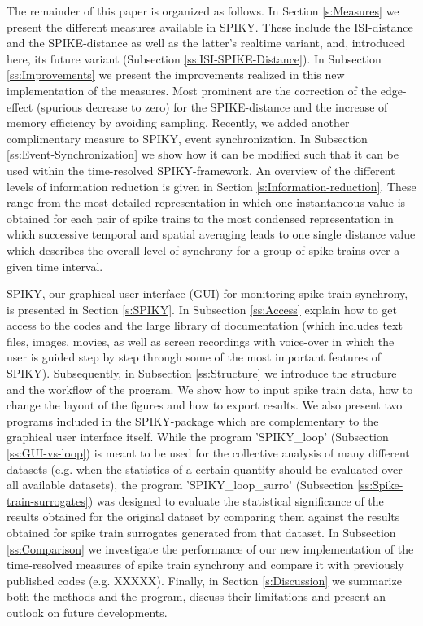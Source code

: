 \documentclass[10pt,twocolumn]{elsart5p}
\begin{document}
The remainder of this paper is organized as follows. In Section \ref{s:Measures} we present the different measures available in SPIKY. These include the ISI-distance and the SPIKE-distance as well as the latter's realtime variant, and, introduced here, its future variant (Subsection \ref{ss:ISI-SPIKE-Distance}). In Subsection \ref{ss:Improvements} we present the improvements realized in this new implementation of the measures. Most prominent are the correction of the edge-effect (spurious decrease to zero) for the SPIKE-distance and the increase of memory efficiency by avoiding sampling. Recently, we added another complimentary measure to SPIKY, event synchronization. In Subsection \ref{ss:Event-Synchronization} we show how it can be modified such that it can be used within the time-resolved SPIKY-framework. An overview of the different levels of information reduction is given in Section \ref{s:Information-reduction}. These range from the most detailed representation in which one instantaneous value is obtained for each pair of spike trains to the most condensed representation in which successive temporal and spatial averaging leads to one single distance value which describes the overall level of synchrony for a group of spike trains over a given time interval.

SPIKY, our graphical user interface (GUI) for monitoring spike train synchrony, is presented in Section \ref{s:SPIKY}. In Subsection \ref{ss:Access} explain how to get access to the codes and the large library of documentation (which includes text files, images, movies, as well as screen recordings with voice-over in which the user is guided step by step through some of the most important features of SPIKY). Subsequently, in Subsection \ref{ss:Structure} we introduce the structure and the workflow of the program. We show how to input spike train data, how to change the layout of the figures and how to export results. We also present two programs included in the SPIKY-package which are complementary to the graphical user interface itself. While the program 'SPIKY\_loop' (Subsection \ref{ss:GUI-vs-loop}) is meant to be used for the collective analysis of many different datasets (e.g. when the statistics of a certain quantity should be evaluated over all available datasets), the program 'SPIKY\_loop\_surro' (Subsection \ref{ss:Spike-train-surrogates}) was designed to evaluate the statistical significance of the results obtained for the original dataset by comparing them against the results obtained for spike train surrogates generated from that dataset. In Subsection \ref{ss:Comparison} we investigate the performance of our new implementation of the time-resolved measures of spike train synchrony and compare it with previously published codes (e.g. \citet{Rusu14} XXXXX). Finally, in Section \ref{s:Discussion} we summarize both the methods and the program, discuss their limitations and present an outlook on future developments.
 
\end{document}
